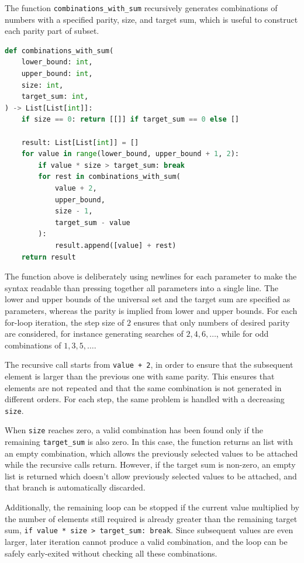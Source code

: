 \documentclass[11pt,a4paper]{article}
\begin{document}
The function \texttt{combinations\_with\_sum} recursively generates combinations of numbers with a specified parity, size, and target sum, which is useful to construct each parity part of subset.

\begin{lstlisting}[language=python]
def combinations_with_sum(
    lower_bound: int,
    upper_bound: int,
    size: int,
    target_sum: int,
) -> List[List[int]]:
    if size == 0: return [[]] if target_sum == 0 else []
    
    result: List[List[int]] = []
    for value in range(lower_bound, upper_bound + 1, 2):
        if value * size > target_sum: break
        for rest in combinations_with_sum(
            value + 2,
            upper_bound,
            size - 1,
            target_sum - value
        ):
            result.append([value] + rest)
    return result
\end{lstlisting}

The function above is deliberately using newlines for each parameter to make the syntax readable than pressing together all parameters into a single line. The lower and upper bounds of the universal set and the target sum are specified as parameters, whereas the parity is implied from lower and upper bounds. For each for-loop iteration, the step size of $2$ ensures that only numbers of desired parity are considered, for instance generating searches of $2, 4, 6, \ldots$, while for odd combinations of $1, 3, 5, \ldots$.

The recursive call starts from \texttt{value + 2}, in order to ensure that the subsequent element is larger than the previous one with same parity. This ensures that elements are not repeated and that the same combination is not generated in different orders. For each step, the same problem is handled with a decreasing \texttt{size}.

When \texttt{size} reaches zero, a valid combination has been found only if the remaining \texttt{target\_sum} is also zero. In this case, the function returns an list with an empty combination, which allows the previously selected values to be attached while the recursive calls return. However, if the target sum is non-zero, an empty list is returned which doesn't allow previously selected values to be attached, and that branch is automatically discarded.

Additionally, the remaining loop can be stopped if the current value multiplied by the number of elements still required is already greater than the remaining target sum, \texttt{if value * size > target\_sum: break}. Since subsequent values are even larger, later iteration cannot produce a valid combination, and the loop can be safely early-exited without checking all these combinations.
\end{document}
